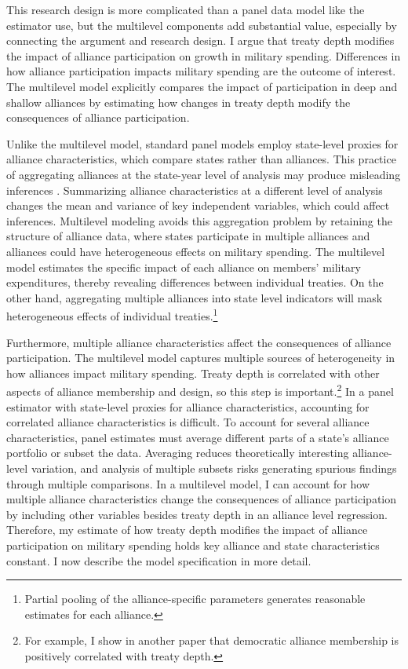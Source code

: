\documentclass[12pt]{article}
\begin{document}
This research design is more complicated than a panel data model like the estimator \citet{DigiuseppePoast2016} use, but the multilevel components add substantial value, especially by connecting the argument and research design.
I argue that treaty depth modifies the impact of alliance participation on growth in military spending. 
Differences in how alliance participation impacts military spending are the outcome of interest.  
The multilevel model explicitly compares the impact of participation in deep and shallow alliances by estimating how changes in treaty depth modify the consequences of alliance participation. 


Unlike the multilevel model, standard panel models employ state-level proxies for alliance characteristics, which compare states rather than alliances.
This practice of aggregating alliances at the state-year level of analysis may produce misleading inferences \citep[pg. 356]{McElreath2016}.
Summarizing alliance characteristics at a different level of analysis changes the mean and variance of key independent variables, which could affect inferences. 
Multilevel modeling avoids this aggregation problem by retaining the structure of alliance data, where states participate in multiple alliances and alliances could have heterogeneous effects on military spending.
The multilevel model estimates the specific impact of each alliance on members' military expenditures, thereby revealing differences between individual treaties. 
On the other hand, aggregating multiple alliances into state level indicators will mask heterogeneous effects of individual treaties.\footnote{Partial pooling of the alliance-specific parameters generates reasonable estimates for each alliance.} 


Furthermore, multiple alliance characteristics affect the consequences of alliance participation.
The multilevel model captures multiple sources of heterogeneity in how alliances impact military spending. 
Treaty depth is correlated with other aspects of alliance membership and design, so this step is important.\footnote{For example, I show in another paper that democratic alliance membership is positively correlated with treaty depth.}
In a panel estimator with state-level proxies for alliance characteristics, accounting for correlated alliance characteristics is difficult. 
To account for several alliance characteristics, panel estimates must average different parts of a state's alliance portfolio or subset the data.
Averaging reduces theoretically interesting alliance-level variation, and analysis of multiple subsets risks generating spurious findings through multiple comparisons.  
In a multilevel model, I can account for how multiple alliance characteristics change the consequences of alliance participation by including other variables besides treaty depth in an alliance level regression. 
Therefore, my estimate of how treaty depth modifies the impact of alliance participation on military spending holds key alliance and state characteristics constant. 
I now describe the model specification in more detail. 
 
\end{document}
